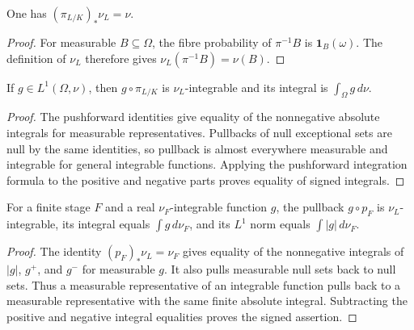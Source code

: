 \begin{lemma}\label{lem:algebraic-base-pushforward}
\leanok
{}
One has $(\pi_{L/K})_*\nu_L=\nu$.
\end{lemma}
\begin{proof}
For measurable $B\subseteq\Omega$, the fibre probability of
$\pi^{-1}B$ is $\mathbf1_B(\omega)$. The definition of $\nu_L$
therefore gives $\nu_L(\pi^{-1}B)=\nu(B)$.
\end{proof}

\begin{proposition}\label{prop:algebraic-base-pullback}
\leanok
{}
If $g\in L^1(\Omega,\nu)$, then $g\circ\pi_{L/K}$ is $\nu_L$-integrable
and its integral is $\int_\Omega g\,d\nu$.
\end{proposition}
\begin{proof}
The pushforward identities give equality of the nonnegative absolute
integrals for measurable representatives. Pullbacks of null
exceptional sets are null by the same identities, so pullback is
almost everywhere measurable and integrable for general integrable
functions. Applying the pushforward integration formula to the positive
and negative parts proves equality of signed integrals.
\end{proof}

\begin{lemma}\label{lem:algebraic-finite-pullback}
\leanok
{}
For a finite stage $F$ and a real $\nu_F$-integrable function $g$,
the pullback $g\circ p_F$ is $\nu_L$-integrable, its integral equals
$\int g\,d\nu_F$, and its $L^1$ norm equals $\int |g|\,d\nu_F$.
\end{lemma}
\begin{proof}
The identity $(p_F)_*\nu_L=\nu_F$ gives equality of the nonnegative
integrals of $|g|$, $g^+$, and $g^-$ for measurable $g$.
It also pulls measurable null sets back to null sets. Thus a measurable
representative of an integrable function pulls back to a measurable
representative with the same finite absolute integral. Subtracting the
positive and negative integral equalities proves the signed assertion.
\end{proof}

